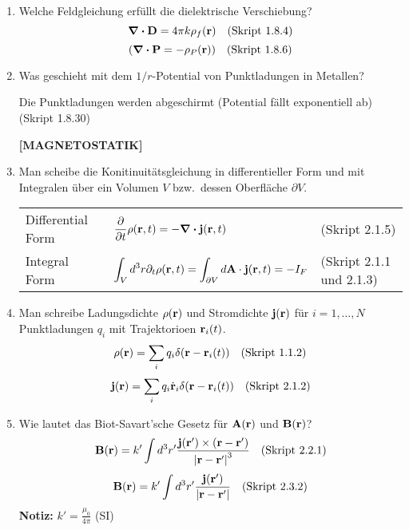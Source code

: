 \documentclass{scrartcl}
\newcommand{\rr}[1]{\frac{#1}{\abs{\vb{r}-\vb{r}'}}}
\newcommand{\ds}{\displaystyle}
\begin{document}
\begin{enumerate}
    \item Welche Feldgleichung erfüllt die dielektrische Verschiebung?
          $$\div \vb D=4\pi k\rho_f(\vb r)\quad\text{(Skript 1.8.4)}$$
          $$\qty(\div \vb P=-\rho_P(\vb r))\quad\text{(Skript 1.8.6)}$$

    \item Was geschieht mit dem $1/r$-Potential von Punktladungen in
          Metallen?
          \begin{center}
            Die Punktladungen werden abgeschirmt (Potential fällt 
            exponentiell ab)
            (Skript 1.8.30)
          \end{center}

    \textbf{[MAGNETOSTATIK]}
    \item Man scheibe die Konitinuitätsgleichung in differentieller Form
          und mit Integralen über ein Volumen $V$ bzw.\ dessen Oberfläche 
          $\partial V$.
          \begin{center}
          \begin{tabular}{lll}
            Differential Form & $\ds\pdv{t}\rho(\vb r, t)=
                                 -\div\vb j(\vb r, t)$
                                & (Skript 2.1.5)\\
            Integral Form     & $\ds\int_V d^3r\partial_t\rho(\vb r,t)=
                                \int_{\partial V}d\vb A\cdot
                                \vb j(\vb r, t)=-I_F$
                                & (Skript 2.1.1 und 2.1.3)\\
          \end{tabular}
          \end{center}

    \item Man schreibe Ladungsdichte $\rho(\vb r)$ und Stromdichte
          $\vb j(\vb r)$ für $i=1,\ldots,N$ Punktladungen $q_i$ mit 
          Trajektorioen $\vb r_i(t)$.
          $$\rho(\vb r)=\sum_i q_i\delta(\vb r-\vb r_i(t))
          \quad \text{(Skript 1.1.2)}$$
          $$\vb j(\vb r)=\sum_i q_i\dot{\vb r}_i\delta(\vb r-\vb r_i(t))
          \quad \text{(Skript 2.1.2)}$$

    \item Wie lautet das Biot-Savart'sche Gesetz für $\vb A(\vb r)$ und
          $\vb B(\vb r)$?
          $$\vb B(\vb r)=k'\int d^3r'\frac{\vb j(\vb r')\times
          (\vb r-\vb r')}{\abs{\vb r-\vb r'}^3}
          \quad \text{(Skript 2.2.1)}$$
          $$\vb B(\vb r)=k'\int d^3r'\rr{\vb j(\vb r')}
          \quad \text{(Skript 2.3.2)}$$
          \textbf{Notiz:} $k'=\frac{\mu_0}{4\pi}$ (SI)


\end{enumerate}
\end{document}
